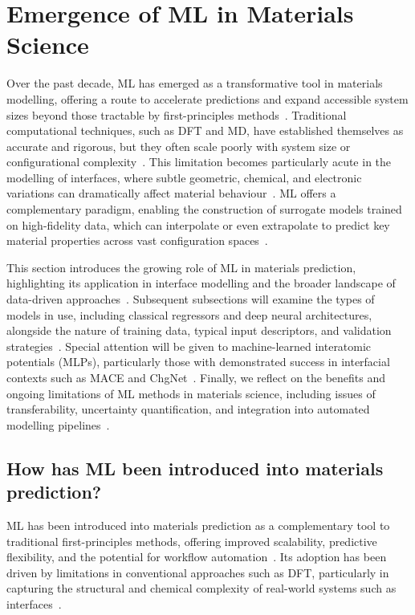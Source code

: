 \newpage \section{Emergence of ML in Materials Science} \label{section:machine_learning}

Over the past decade, ML has emerged as a transformative tool in materials modelling, offering a route to accelerate predictions and expand accessible system sizes beyond those tractable by first-principles methods~\cite{Schutt2018-xc, Schutt2019-sz, Owen2024-wp, Pyzer-Knapp2025-uq}.
Traditional computational techniques, such as DFT and MD, have established themselves as accurate and rigorous, but they often scale poorly with system size or configurational complexity~\nocite{}.
This limitation becomes particularly acute in the modelling of interfaces, where subtle geometric, chemical, and electronic variations can dramatically affect material behaviour~\cite{Batzner2022-fd, Leung2020-tv, Owen2024-wp}.
ML offers a complementary paradigm, enabling the construction of surrogate models trained on high-fidelity data, which can interpolate or even extrapolate to predict key material properties across vast configuration spaces~\cite{Batzner2022-fd, Rosen2022-pw, Schutt2019-sz}.

This section introduces the growing role of ML in materials prediction, highlighting its application in interface modelling and the broader landscape of data-driven approaches~\nocite{}.
Subsequent subsections will examine the types of models in use, including classical regressors and deep neural architectures, alongside the nature of training data, typical input descriptors, and validation strategies~\nocite{}.
Special attention will be given to machine-learned interatomic potentials (MLPs), particularly those with demonstrated success in interfacial contexts such as MACE and ChgNet~\nocite{}.
Finally, we reflect on the benefits and ongoing limitations of ML methods in materials science, including issues of transferability, uncertainty quantification, and integration into automated modelling pipelines~\nocite{}.

\newpage \subsection*{How has ML been introduced into materials prediction?}

ML has been introduced into materials prediction as a complementary tool to traditional first-principles methods, offering improved scalability, predictive flexibility, and the potential for workflow automation~\nocite{}.
Its adoption has been driven by limitations in conventional approaches such as DFT, particularly in capturing the structural and chemical complexity of real-world systems such as interfaces~\cite{Batzner2022-fd, Gerber2023-yd, Wei2021-fi}.

